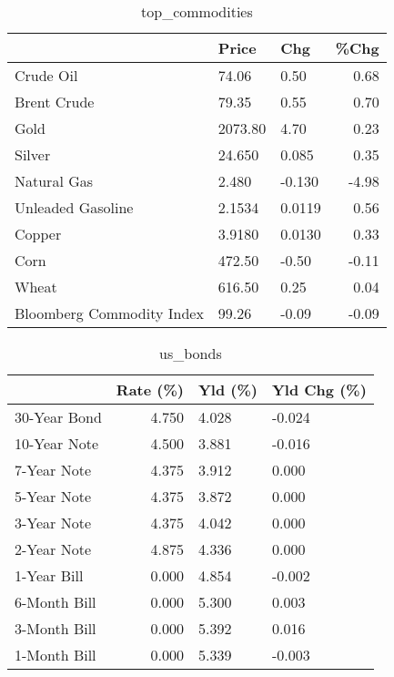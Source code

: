 \documentclass{article}%
\begin{document}
\begin{table}[htbp]%
\caption{top\_commodities}%
\centering%
\begin{adjustbox}{width=1\textwidth}%
\begin{tabular}{lllr}
\toprule
                          &   Price &    Chg &  \%Chg \\
\midrule
               Crude Oil  &   74.06 &   0.50 &  0.68 \\
             Brent Crude  &   79.35 &   0.55 &  0.70 \\
                    Gold  & 2073.80 &   4.70 &  0.23 \\
                  Silver  &  24.650 &  0.085 &  0.35 \\
             Natural Gas  &   2.480 & -0.130 & -4.98 \\
       Unleaded Gasoline  &  2.1534 & 0.0119 &  0.56 \\
                  Copper  &  3.9180 & 0.0130 &  0.33 \\
                    Corn  &  472.50 &  -0.50 & -0.11 \\
                   Wheat  &  616.50 &   0.25 &  0.04 \\
Bloomberg Commodity Index &   99.26 &  -0.09 & -0.09 \\
\bottomrule
\end{tabular}
%
\end{adjustbox}%
\end{table}

%


\begin{table}[htbp]%
\caption{us\_bonds}%
\centering%
\begin{adjustbox}{width=1\textwidth}%
\begin{tabular}{lrll}
\toprule
             &  Rate (\%) & Yld (\%) & Yld Chg (\%) \\
\midrule
30-Year Bond &     4.750 &   4.028 &      -0.024 \\
10-Year Note &     4.500 &   3.881 &      -0.016 \\
 7-Year Note &     4.375 &   3.912 &       0.000 \\
 5-Year Note &     4.375 &   3.872 &       0.000 \\
 3-Year Note &     4.375 &   4.042 &       0.000 \\
 2-Year Note &     4.875 &   4.336 &       0.000 \\
 1-Year Bill &     0.000 &   4.854 &      -0.002 \\
6-Month Bill &     0.000 &   5.300 &       0.003 \\
3-Month Bill &     0.000 &   5.392 &       0.016 \\
1-Month Bill &     0.000 &   5.339 &      -0.003 \\
\bottomrule
\end{tabular}
%
\end{adjustbox}%
\end{table}
\end{document}
